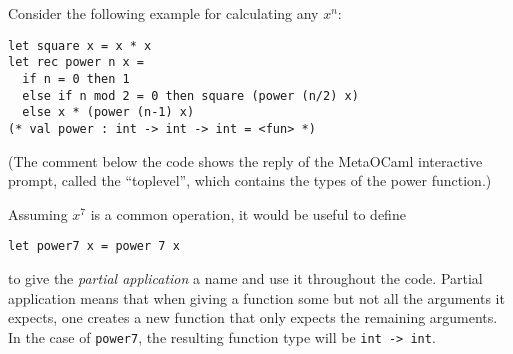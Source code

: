 \documentclass[12pt, titlepage]{article}
\begin{document}
Consider the following example for calculating any $x^n$:
\begin{lstlisting}
let square x = x * x
let rec power n x =
  if n = 0 then 1
  else if n mod 2 = 0 then square (power (n/2) x)
  else x * (power (n-1) x)
(* val power : int -> int -> int = <fun> *)
\end{lstlisting}

(The comment below the code shows the reply of the MetaOCaml interactive 
prompt, called the ``toplevel'', which contains the types of the power 
function.)

Assuming $x^7$ is a common operation, it would be useful to define
\begin{lstlisting}
let power7 x = power 7 x
\end{lstlisting}
to give the \emph{partial application} a name and use it throughout the code. 
Partial application means 
that when giving a function some but not all the arguments it expects, one 
creates a new function that only expects the remaining arguments. In the case 
of \lstinline|power7|, the resulting function type will be 
\lstinline|int -> int|.
\end{document}

